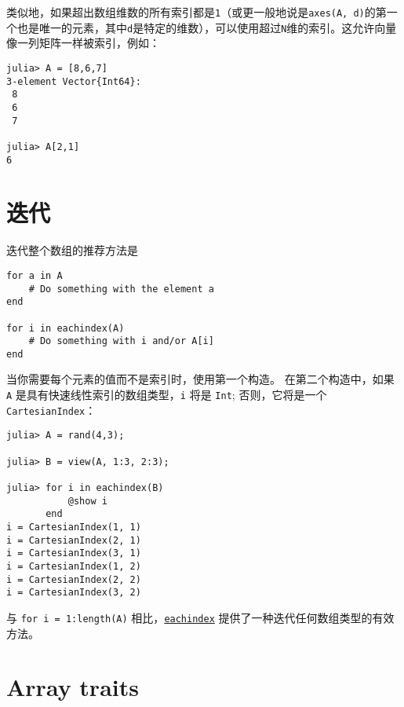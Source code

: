 类似地，如果超出数组维数的所有索引都是\texttt{1}（或更一般地说是\texttt{axes(A, d)}的第一个也是唯一的元素，其中\texttt{d}是特定的维数），可以使用超过\texttt{N}维的索引。这允许向量像一列矩阵一样被索引，例如：




\begin{verbatim}
julia> A = [8,6,7]
3-element Vector{Int64}:
 8
 6
 7

julia> A[2,1]
6
\end{verbatim}



\hypertarget{36994114593650767}{}


\section{迭代}



迭代整个数组的推荐方法是




\begin{verbatim}
for a in A
    # Do something with the element a
end

for i in eachindex(A)
    # Do something with i and/or A[i]
end
\end{verbatim}



当你需要每个元素的值而不是索引时，使用第一个构造。 在第二个构造中，如果 \texttt{A} 是具有快速线性索引的数组类型，\texttt{i} 将是 \texttt{Int}; 否则，它将是一个 \texttt{CartesianIndex}：




\begin{verbatim}
julia> A = rand(4,3);

julia> B = view(A, 1:3, 2:3);

julia> for i in eachindex(B)
           @show i
       end
i = CartesianIndex(1, 1)
i = CartesianIndex(2, 1)
i = CartesianIndex(3, 1)
i = CartesianIndex(1, 2)
i = CartesianIndex(2, 2)
i = CartesianIndex(3, 2)
\end{verbatim}



与 \texttt{for i = 1:length(A)} 相比，\hyperlink{4701773772897287974}{\texttt{eachindex}} 提供了一种迭代任何数组类型的有效方法。



\hypertarget{10166346050354504892}{}


\section{Array traits}



